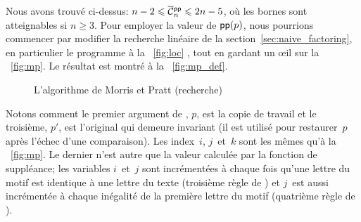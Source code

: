 \vspace*{-20pt}


Nous avons trouvé ci-dessus: \(n-2 \leqslant \OC{\fun{pp}}{n}
\leqslant 2n - 5\), où les bornes sont atteignables si \(n \geqslant
3\). Pour employer la valeur de \(\textsf{pp}(p)\), nous pourrions
commencer par modifier la recherche linéaire de la
section~\ref{sec:naive_factoring}, en particulier le programme à la
\fig~\ref{fig:loc} , tout en gardant un {\oe}il sur
la \fig~\vref{fig:mp}. Le résultat est montré à la
\fig~\vref{fig:mp_def}.
\begin{figure}[b]
\centering
\abovedisplayskip=0pt
\belowdisplayskip=0pt
\caption{L'algorithme de Morris et Pratt (recherche)}
\label{fig:mp_def}
\end{figure}
Notons comment le premier argument de ,
\(p\), est la copie de travail et le troisième, \(p'\), est l'original
qui demeure invariant (il est utilisé pour restaurer~\(p\) après
l'échec d'une comparaison). Les index~\(i\), \(j\)~et~\(k\) sont les
mêmes qu'à la \fig~\vref{fig:mp}. Le dernier n'est autre que la valeur
calculée par la fonction de suppléance; les variables \(i\)~et~\(j\)
sont incrémentées à chaque fois qu'une lettre du motif est identique à
une lettre du texte (troisième règle de ) et \(j\)~est aussi
incrémentée à chaque inégalité de la première lettre du motif
(quatrième règle de ).



